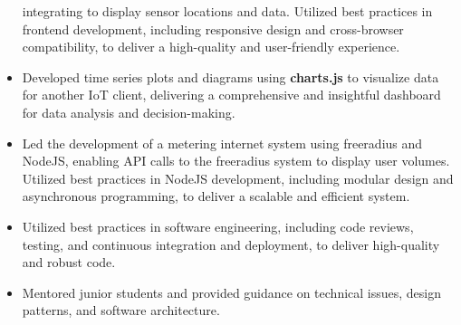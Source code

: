 \begin{itemize}
    integrating  to display sensor locations and data.
    Utilized best practices in frontend development, including responsive design and cross-browser compatibility, to deliver a high-quality and user-friendly experience.
  \item Developed time series plots and diagrams using \textbf{charts.js} to visualize data for another IoT client,
    delivering a comprehensive and insightful dashboard for data analysis and decision-making.
  \item Led the development of a metering internet system using freeradius and NodeJS, enabling API calls to the freeradius system to display user volumes.
    Utilized best practices in NodeJS development, including modular design and asynchronous programming, to deliver a scalable and efficient system.
  \item Utilized best practices in software engineering, including code reviews, testing, and continuous
    integration and deployment, to deliver high-quality and robust code.
  \item Mentored junior students and provided guidance on technical issues,
    design patterns, and software architecture.
\end{itemize}
